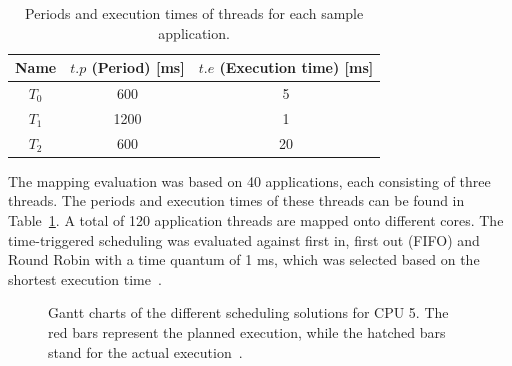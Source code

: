           \begin{table}[t!]
	\begin{center}
		\caption{Periods and execution times of threads for each sample application.}
		\begin{tabular}{@{}ccc@{}}
			\toprule
			Name & $t.p$ (Period) [ms] & $t.e$ (Execution time) [ms]\\
			\midrule
			$T_{0}$ & 600 & 5 \\
			$T_{1}$ & 1200 & 1 \\
			$T_{2}$ & 600 & 20 \\
			\bottomrule
		\end{tabular}
		 \label{threads}
	\end{center}
    \end{table}
    The mapping evaluation was based on 40 applications, each consisting of three threads. The periods and execution times of these threads can be found in Table~\ref{threads}. A total of 120 application threads are mapped onto different cores. The time-triggered scheduling was evaluated against first in, first out (FIFO) and Round Robin with a time quantum of 1 ms, which was selected based on the shortest execution time~\cite{askaripoor2023designer,leontyev2007tardiness, rasmussen2008round}.
         \begin{figure}[b!]
	\centering
	\caption{Gantt charts of the different scheduling solutions for CPU 5. The
    red bars represent the planned execution, while the hatched bars stand for the actual execution~\cite{askaripoor2023designer}.}
	\label{fig:gantt}
    \end{figure}
